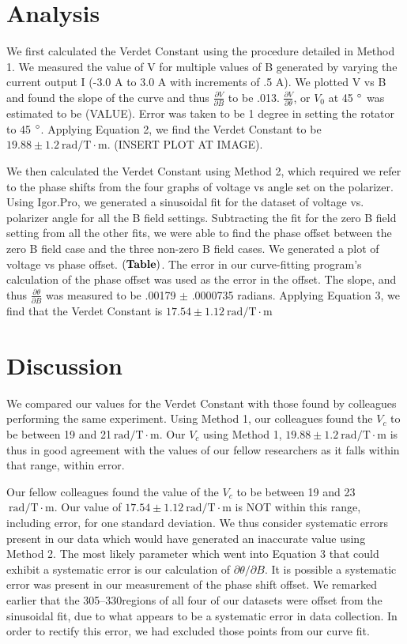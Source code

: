 \documentclass[prb,preprint]{revtex4-1}
\begin{document}
\section{Analysis}
{We first calculated the Verdet Constant using the procedure detailed in Method 1.  We measured the value of V for multiple values of B generated by varying the current output I (-3.0 A to 3.0 A with increments of .5 A).  We plotted V vs B and found the slope of the curve and thus $\frac{\partial V}{\partial B}$ to be .013.  $\frac{\partial V}{\partial \theta}$, or $V_{0}$ at 45 $\degree$ was estimated to be (VALUE).  Error was taken to be 1 degree in setting the rotator to 45 $\degree$.  Applying Equation 2, we find the Verdet Constant to be $19.88 \pm 1.2 \mathrm{~rad/T} \cdot \textrm{m}$. (INSERT PLOT AT IMAGE).
{We then calculated the Verdet Constant using Method 2, which required we refer to the phase shifts from the four graphs of voltage vs angle set on the polarizer.  Using Igor.Pro, we generated a sinusoidal fit for the dataset of voltage vs. polarizer angle for all the B field settings.  Subtracting the fit for the zero B field setting from all the other fits, we were able to find the phase offset between the zero B field case and the three non-zero B field cases.  We generated a plot of voltage vs phase offset.  $\bf (Table)$.  The error in our curve-fitting program's calculation of the phase offset was used as the error in the offset.  The slope, and thus $\frac{\partial \theta}{\partial B}$ was measured to be .00179 $\pm$ .0000735 radians.  Applying Equation 3, we find that the Verdet Constant is $17.54 \pm 1.12 \mathrm{~rad/T} \cdot \textrm{m}$

\section{Discussion}

{We compared our values for the Verdet Constant with those found by colleagues performing the same experiment.  Using Method 1, our colleagues found the $V_{c}$ to be between 19 and 21$\mathrm{~rad/T} \cdot \textrm{m}$.  Our $V_{c}$ using Method 1, $19.88 \pm 1.2 \mathrm{~rad/T} \cdot \textrm{m}$ is thus in good agreement with the values of our fellow researchers as it falls within that range, within error.

{Our fellow colleagues found the value of the $V_{c}$ to be between 19 and 23 $\mathrm{~rad/T} \cdot \textrm{m}$.  Our value of $17.54 \pm 1.12 \mathrm{~rad/T} \cdot \textrm{m}$ is NOT within this range, including error, for one standard deviation.  We thus consider systematic errors present in our data which would have generated an inaccurate value using Method 2.  The most likely parameter which went into Equation 3 that could exhibit a systematic error is our calculation of $\partial \theta/\partial B$.  It is possible a systematic error was present in our measurement of the phase shift offset.  We remarked earlier that the 305\degree--330\degree regions of all four of our datasets were offset from the sinusoidal fit, due to what appears to be a systematic error in data collection.  In order to rectify this error, we had excluded those points from our curve fit. 



}}}}
\end{document}
